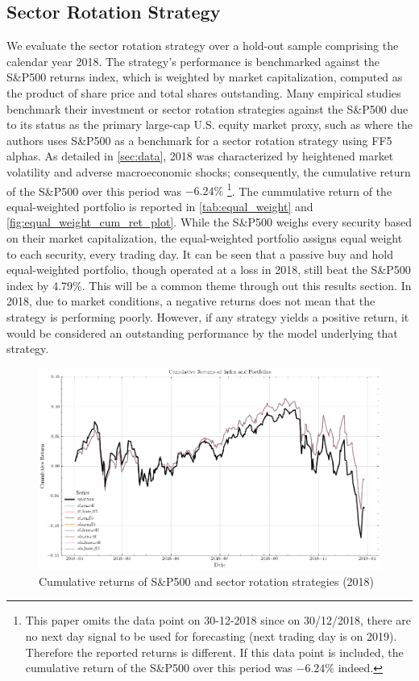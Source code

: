 \subsection{Sector Rotation Strategy}
We evaluate the sector rotation strategy over a hold-out sample comprising the calendar year 2018. The strategy's performance is benchmarked against the S\&P500 returns index, which is weighted by market capitalization, computed as the product of share price and total shares outstanding. Many empirical studies benchmark their investment or sector rotation strategies against the S\&P500 due to its status as the primary large-cap U.S. equity market proxy, such as  where the authors uses S\&P500 as a benchmark for a sector rotation strategy using FF5 alphas. As detailed in \cref{sec:data}, 2018 was characterized by heightened market volatility and adverse macroeconomic shocks; consequently, the cumulative return of the S\&P500 over this period was $-6.24\%$ \footnote{This paper omits the data point on 30-12-2018 since on 30/12/2018, there are no next day signal to be used for forecasting (next trading day is on 2019). Therefore the reported returns is different. If this data point is included, the cumulative return of the S\&P500 over this period was $-6.24\%$ indeed.}. The cummulative return of the equal-weighted portfolio is reported in \cref{tab:equal_weight} and \cref{fig:equal_weight_cum_ret_plot}. While the S\&P500 weighs every security based on their market capitalization, the equal-weighted portfolio assigns equal weight to each security, every trading day. It can be seen that a passive buy and hold equal-weighted portfolio, though operated at a loss in 2018, still beat the S\&P500 index by 4.79\%. This will be a common theme through out this results section. In 2018, due to market conditions, a negative returns does not mean that the strategy is performing poorly. However, if any strategy yields a positive return, it would be considered an outstanding performance by the model underlying that strategy.

\begin{figure}[H]
    \centering
    \includegraphics[width=\textwidth]{plots/results/equal_w_cum_ret_plot.png}
    \caption{Cumulative returns of S\&P500 and sector rotation strategies (2018)}\label{fig:eq_w_cum_ret_plot}
\end{figure}


